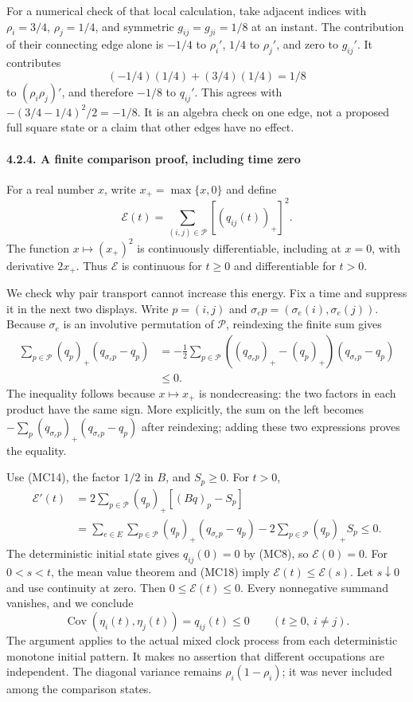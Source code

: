 \documentclass[
  11pt,
  a4paper,
]{article}
\begin{document}
For a numerical check of that local calculation, take adjacent indices
with \(\rho_i=3/4\), \(\rho_j=1/4\), and symmetric \(g_{ij}=g_{ji}=1/8\)
at an instant. The contribution of their connecting edge alone is
\(-1/4\) to \(\rho_i'\), \(1/4\) to \(\rho_j'\), and zero to
\(g_{ij}'\). It contributes \[
(-1/4)(1/4)+(3/4)(1/4)=1/8
\] to \((\rho_i\rho_j)'\), and therefore \(-1/8\) to \(q_{ij}'\). This
agrees with \(-(3/4-1/4)^2/2=-1/8\). It is an algebra check on one edge,
not a proposed full square state or a claim that other edges have no
effect.

\paragraph{4.2.4. A finite comparison proof, including time
zero}\label{a-finite-comparison-proof-including-time-zero}

For a real number \(x\), write \(x_+=\max\{x,0\}\) and define \[
\mathcal E(t)=\sum_{(i,j)\in\mathcal P}[(q_{ij}(t))_+]^2.
\] The function \(x\mapsto(x_+)^2\) is continuously differentiable,
including at \(x=0\), with derivative \(2x_+\). Thus \(\mathcal E\) is
continuous for \(t\geq0\) and differentiable for \(t>0\).

We check why pair transport cannot increase this energy. Fix a time and
suppress it in the next two displays. Write \(p=(i,j)\) and
\(\sigma_e p=(\sigma_e(i),\sigma_e(j))\). Because \(\sigma_e\) is an
involutive permutation of \(\mathcal P\), reindexing the finite sum
gives \[
\begin{aligned}
\sum_{p\in\mathcal P}(q_p)_+(q_{\sigma_e p}-q_p)
&=-\frac12\sum_{p\in\mathcal P}
((q_{\sigma_e p})_+-(q_p)_+)(q_{\sigma_e p}-q_p)\\
&\leq0.
\end{aligned}
\tag{MC17}
\] The inequality follows because \(x\mapsto x_+\) is nondecreasing: the
two factors in each product have the same sign. More explicitly, the sum
on the left becomes \(-\sum_p (q_{\sigma_e p})_+(q_{\sigma_e p}-q_p)\)
after reindexing; adding these two expressions proves the equality.

Use (MC14), the factor \(1/2\) in \(B\), and \(S_p\geq0\). For \(t>0\),
\[
\begin{aligned}
\mathcal E'(t)
&=2\sum_{p\in\mathcal P}(q_p)_+[(Bq)_p-S_p]\\
&=\sum_{e\in E}\sum_{p\in\mathcal P}
(q_p)_+(q_{\sigma_e p}-q_p)
-2\sum_{p\in\mathcal P}(q_p)_+S_p
\leq0.
\end{aligned}
\tag{MC18}
\] The deterministic initial state gives \(q_{ij}(0)=0\) by (MC8), so
\(\mathcal E(0)=0\). For \(0<s<t\), the mean value theorem and (MC18)
imply \(\mathcal E(t)\leq\mathcal E(s)\). Let \(s\downarrow0\) and use
continuity at zero. Then \(0\leq\mathcal E(t)\leq0\). Every nonnegative
summand vanishes, and we conclude \[
\operatorname{Cov}(\eta_i(t),\eta_j(t))
=q_{ij}(t)\leq0\qquad(t\geq0,\ i\ne j).
\tag{MC19}
\] The argument applies to the actual mixed clock process from each
deterministic monotone initial pattern. It makes no assertion that
different occupations are independent. The diagonal variance remains
\(\rho_i(1-\rho_i)\); it was never included among the comparison states.
\end{document}
